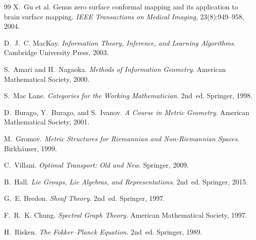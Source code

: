 \documentclass[12pt,a4paper,oneside]{book}
\numberwithin{equation}{chapter}
\theoremstyle{plain}
\theoremstyle{definition}
\theoremstyle{remark}
\begin{document}
\begin{thebibliography}{99}
X.~Gu et al.
\newblock Genus zero surface conformal mapping and its application to brain
  surface mapping.
\newblock \emph{IEEE Transactions on Medical Imaging}, 23(8):949--958, 2004.

D.~J.~C. MacKay.
\newblock \emph{Information Theory, Inference, and Learning Algorithms}.
\newblock Cambridge University Press, 2003.

S.~Amari and H.~Nagaoka.
\newblock \emph{Methods of Information Geometry}.
\newblock American Mathematical Society, 2000.

S.~Mac Lane.
\newblock \emph{Categories for the Working Mathematician}.
\newblock 2nd~ed. Springer, 1998.

D.~Burago, Y.~Burago, and S.~Ivanov.
\newblock \emph{A Course in Metric Geometry}.
\newblock American Mathematical Society, 2001.

M.~Gromov.
\newblock \emph{Metric Structures for Riemannian and Non-Riemannian Spaces}.
\newblock Birkh\"{a}user, 1999.

C.~Villani.
\newblock \emph{Optimal Transport: Old and New}.
\newblock Springer, 2009.

B.~Hall.
\newblock \emph{Lie Groups, Lie Algebras, and Representations}.
\newblock 2nd~ed. Springer, 2015.

G.~E. Bredon.
\newblock \emph{Sheaf Theory}.
\newblock 2nd~ed. Springer, 1997.

F.~R.~K. Chung.
\newblock \emph{Spectral Graph Theory}.
\newblock American Mathematical Society, 1997.

H.~Risken.
\newblock \emph{The Fokker--Planck Equation}.
\newblock 2nd~ed. Springer, 1989.

\end{thebibliography}

\printindex
\end{document}
